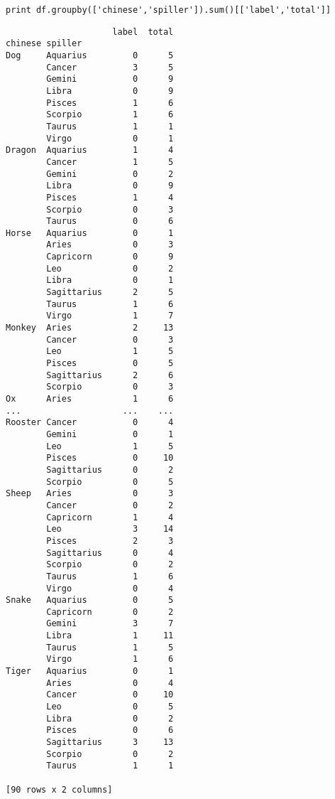 \documentclass[12pt,fleqn]{article}\usepackage{../common}
\begin{document}
\begin{verbatim}
print df.groupby(['chinese','spiller']).sum()[['label','total']]
\end{verbatim}

\begin{verbatim}
                     label  total
chinese spiller                  
Dog     Aquarius         0      5
        Cancer           3      5
        Gemini           0      9
        Libra            0      9
        Pisces           1      6
        Scorpio          1      6
        Taurus           1      1
        Virgo            0      1
Dragon  Aquarius         1      4
        Cancer           1      5
        Gemini           0      2
        Libra            0      9
        Pisces           1      4
        Scorpio          0      3
        Taurus           0      6
Horse   Aquarius         0      1
        Aries            0      3
        Capricorn        0      9
        Leo              0      2
        Libra            0      1
        Sagittarius      2      5
        Taurus           1      6
        Virgo            1      7
Monkey  Aries            2     13
        Cancer           0      3
        Leo              1      5
        Pisces           0      5
        Sagittarius      2      6
        Scorpio          0      3
Ox      Aries            1      6
...                    ...    ...
Rooster Cancer           0      4
        Gemini           0      1
        Leo              1      5
        Pisces           0     10
        Sagittarius      0      2
        Scorpio          0      5
Sheep   Aries            0      3
        Cancer           0      2
        Capricorn        1      4
        Leo              3     14
        Pisces           2      3
        Sagittarius      0      4
        Scorpio          0      2
        Taurus           1      6
        Virgo            0      4
Snake   Aquarius         0      5
        Capricorn        0      2
        Gemini           3      7
        Libra            1     11
        Taurus           1      5
        Virgo            1      6
Tiger   Aquarius         0      1
        Aries            0      4
        Cancer           0     10
        Leo              0      5
        Libra            0      2
        Pisces           0      6
        Sagittarius      3     13
        Scorpio          0      2
        Taurus           1      1

[90 rows x 2 columns]
\end{verbatim}
\end{document}
